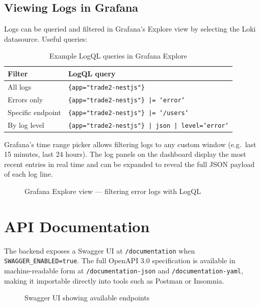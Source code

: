 \documentclass[12pt, a4paper]{article}
\begin{document}
\subsection{Viewing Logs in Grafana}

Logs can be queried and filtered in Grafana's Explore view by selecting the Loki datasource. Useful queries:

\begin{table}[H]
    \centering
    \begin{tabular}{@{}ll@{}}
        \toprule
        \textbf{Filter} & \textbf{LogQL query} \\
        \midrule
        All logs & \texttt{\{app="trade2-nestjs"\}} \\
        Errors only & \texttt{\{app="trade2-nestjs"\} |= `error`} \\
        Specific endpoint & \texttt{\{app="trade2-nestjs"\} |= `/users`} \\
        By log level & \texttt{\{app="trade2-nestjs"\} | json | level=`error`} \\
        \bottomrule
    \end{tabular}
    \caption{Example LogQL queries in Grafana Explore}
\end{table}

Grafana's time range picker allows filtering logs to any custom window (e.g.\ last 15 minutes, last 24 hours). The log panels on the dashboard display the most recent entries in real time and can be expanded to reveal the full JSON payload of each log line.

\begin{figure}[H]
    \centering
    \fbox{\rule{0pt}{6cm}\rule{12cm}{0pt}}
    \caption{Grafana Explore view — filtering error logs with LogQL}
    \label{fig:loki-explore}
\end{figure}

\section{API Documentation}

The backend exposes a Swagger UI at \texttt{/documentation} when \texttt{SWAGGER\_ENABLED=true}. The full OpenAPI 3.0 specification is available in machine-readable form at \texttt{/documentation-json} and \texttt{/documentation-yaml}, making it importable directly into tools such as Postman or Insomnia.

\begin{figure}[H]
    \centering
    \fbox{\rule{0pt}{6cm}\rule{12cm}{0pt}}
    \caption{Swagger UI showing available endpoints}
    \label{fig:swagger}
\end{figure}
\end{document}
